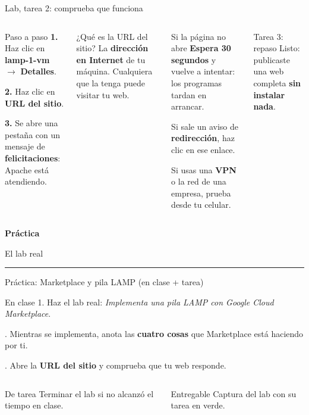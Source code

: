 \documentclass[aspectratio=169,10pt,c]{beamer}
\newcommand{\separador}[2]{%
\begin{frame}[plain]
\vfill
\begin{center}
{\fontsize{29}{34}\selectfont\bfseries #1}\par
\vspace{2mm}
{\small #2}\par
\vspace{4mm}
{\color{utpRojo}\rule{8.5cm}{1.2pt}}
\end{center}
\vfill
\end{frame}}
\begin{document}
\begin{frame}{Lab, tarea 2: comprueba que funciona}
\begin{columns}[T,onlytextwidth]
\begin{block}{Paso a paso}
\small
\textbf{1.} Haz clic en \textbf{lamp-1-vm} $\rightarrow$ \textbf{Detalles}.\par\smallskip
\textbf{2.} Haz clic en \textbf{URL del sitio}.\par\smallskip
\textbf{3.} Se abre una pestaña con un mensaje de \textbf{felicitaciones}: Apache está atendiendo.
\end{block}
\begin{exampleblock}{¿Qué es la URL del sitio?}
\small La \textbf{dirección en Internet} de tu máquina. Cualquiera que la tenga puede visitar tu web.
\end{exampleblock}
\begin{alertblock}{Si la página no abre}
\small
\textbf{Espera 30 segundos} y vuelve a intentar: los programas tardan en arrancar.\par\smallskip
Si sale un aviso de \textbf{redirección}, haz clic en ese enlace.\par\smallskip
Si usas una \textbf{VPN} o la red de una empresa, prueba desde tu celular.
\end{alertblock}
\begin{block}{Tarea 3: repaso}
\small Listo: publicaste una web completa \textbf{sin instalar nada}.
\end{block}
\end{columns}
\end{frame}

\separador{Práctica}{El lab real}

\begin{frame}{Práctica: Marketplace y pila LAMP \textnormal{\small(en clase + tarea)}}
\begin{block}{En clase}
\small
1. Haz el lab real: \emph{Implementa una pila LAMP con Google Cloud Marketplace}.\par{}. Mientras se implementa, anota las \textbf{cuatro cosas} que Marketplace está haciendo por ti.\par{}. Abre la \textbf{URL del sitio} y comprueba que tu web responde.
\end{block}
\begin{columns}[T,onlytextwidth]
\begin{exampleblock}{De tarea}
\small Terminar el lab si no alcanzó el tiempo en clase.
\end{exampleblock}
\begin{alertblock}{Entregable}
\small Captura del lab con su tarea en verde.
\end{alertblock}
\end{columns}
\end{frame}
\end{document}
